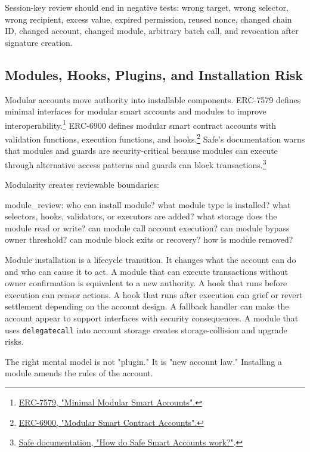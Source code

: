 Session-key review should end in negative tests: wrong target, wrong selector, wrong recipient, excess value, expired permission, reused nonce, changed chain ID, changed account, changed module, arbitrary batch call, and revocation after signature creation.

\subsection{Modules, Hooks, Plugins, and Installation Risk}

Modular accounts move authority into installable components. ERC-7579 defines minimal interfaces for modular smart accounts and modules to improve interoperability.\footnote{\href{https://eips.ethereum.org/EIPS/eip-7579}{ERC-7579, "Minimal Modular Smart Accounts".}} ERC-6900 defines modular smart contract accounts with validation functions, execution functions, and hooks.\footnote{\href{https://eips.ethereum.org/EIPS/eip-6900}{ERC-6900, "Modular Smart Contract Accounts".}} Safe's documentation warns that modules and guards are security-critical because modules can execute through alternative access patterns and guards can block transactions.\footnote{\href{https://docs.safe.global/advanced/smart-account-overview}{Safe documentation, "How do Safe Smart Accounts work?"}.}

Modularity creates reviewable boundaries:

\begin{codeblock}
module_review:
    who can install module?
    what module type is installed?
    what selectors, hooks, validators, or executors are added?
    what storage does the module read or write?
    can module call account execution?
    can module bypass owner threshold?
    can module block exits or recovery?
    how is module removed?
\end{codeblock}

Module installation is a lifecycle transition. It changes what the account can do and who can cause it to act. A module that can execute transactions without owner confirmation is equivalent to a new authority. A hook that runs before execution can censor actions. A hook that runs after execution can grief or revert settlement depending on the account design. A fallback handler can make the account appear to support interfaces with security consequences. A module that uses \texttt{delegatecall} into account storage creates storage-collision and upgrade risks.

The right mental model is not "plugin." It is "new account law." Installing a module amends the rules of the account.

